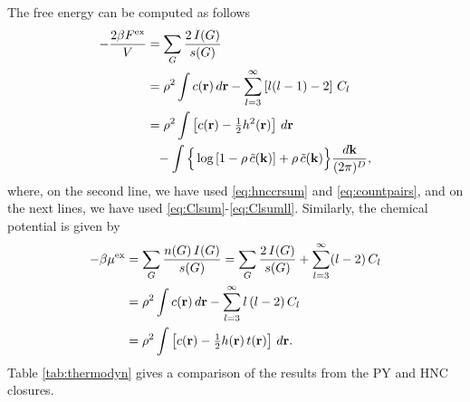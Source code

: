 \documentclass[notitlepage,preprint]{revtex4-1}
\newcommand{\vct}[1]{\mathbf{#1}}
\providecommand{\vr}{} %
\renewcommand{\vr}{\vct{r}}
\newcommand{\vk}{\vct{k}}
\newcommand{\dvk}{\frac{d\vk}{(2\pi)^D}}
\newcommand{\supex}[1]{ { { #1 }^{ \mathrm{ex} } } }
\newcommand{\Fex}{\supex{F}}
\newcommand{\muex}{\supex{\mu}}
\begin{document}
The free energy can be computed
  as follows\cite{morita1958, *morita1959, *morita1960, singer1985}
%
\begin{align}
    - \frac{ 2 \beta \Fex } { V }
  &=
      \sum_G \frac{ 2 \, I(G) } { s(G) }
      \notag \\
  &=
      \rho^2 \int c(\vr) \, d\vr
    - \sum_{l = 3}^\infty \left[ l(l-1) - 2 \right] \, C_l
      \notag \\
  &=
      \rho^2 \int \left[ c(\vr) - \tfrac{1}{2} h^2(\vr) \right] \, d\vr
      \notag \\
  & \hphantom{=}
    - \int  \Big\{
              \log\left[ 1 - \rho \, \tilde{c}(\vk) \right]
                           + \rho \, \tilde{c}(\vk)
            \Big\}  \dvk,
\label{eq:hncF}
\end{align}
%
where,
  on the second line,
  we have used \eqref{eq:hnccrsum} and \eqref{eq:countpairs},
  and on the next lines,
  we have used \eqref{eq:Clsum}-\eqref{eq:Clsumll}.
%
Similarly, the chemical potential
  is given by\cite{morita1958, *morita1959, *morita1960, singer1985}
%
\begin{align}
    - \beta \muex
  &=
      \sum_G \frac{ n(G) \, I(G) } { s(G) }
  =
      \sum_G \frac{ 2 \, I(G) } { s(G) }
    + \sum_{l = 3}^\infty (l-2) \, C_l
      \notag \\
  &=
      \rho^2 \int c(\vr) \, d\vr
    - \sum_{l = 3}^\infty l \, (l-2) \, C_l
      \notag \\
  &=
      \rho^2 \int \left[ c(\vr) - \tfrac{1}{2} h(\vr) \, t(\vr) \right] \, d\vr.
\label{eq:hncmu}
\end{align}
%
Table \ref{tab:thermodyn} gives
  a comparison of the results from the PY and HNC closures.




\end{document}
